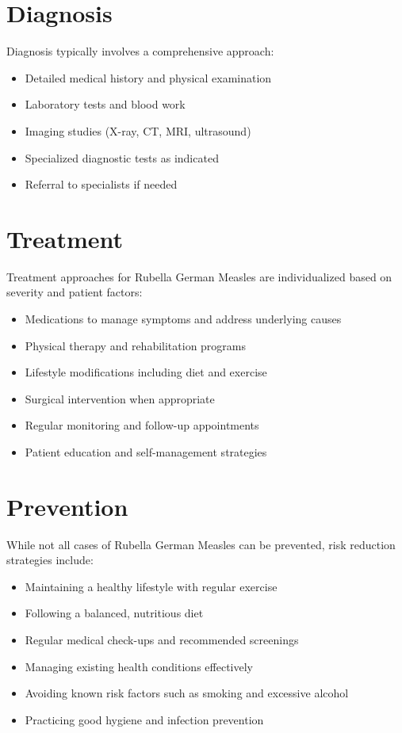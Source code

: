 \section*{Diagnosis}
Diagnosis typically involves a comprehensive approach:

\begin{itemize}
\item Detailed medical history and physical examination
\item Laboratory tests and blood work
\item Imaging studies (X-ray, CT, MRI, ultrasound)
\item Specialized diagnostic tests as indicated
\item Referral to specialists if needed
\end{itemize}

\section*{Treatment}
Treatment approaches for Rubella German Measles are individualized based on severity and patient factors:

\begin{itemize}
\item Medications to manage symptoms and address underlying causes
\item Physical therapy and rehabilitation programs
\item Lifestyle modifications including diet and exercise
\item Surgical intervention when appropriate
\item Regular monitoring and follow-up appointments
\item Patient education and self-management strategies
\end{itemize}

\section*{Prevention}
While not all cases of Rubella German Measles can be prevented, risk reduction strategies include:

\begin{itemize}
\item Maintaining a healthy lifestyle with regular exercise
\item Following a balanced, nutritious diet
\item Regular medical check-ups and recommended screenings
\item Managing existing health conditions effectively
\item Avoiding known risk factors such as smoking and excessive alcohol
\item Practicing good hygiene and infection prevention
\end{itemize}

